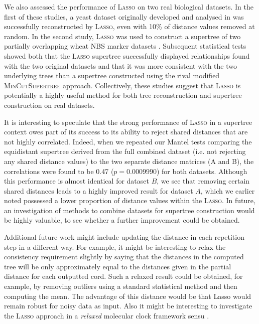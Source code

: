 We also assessed the performance of \textsc{Lasso} on two real biological
datasets. In the first of these studies, a yeast dataset originally developed
and analysed in \cite{west14ribosomal} was successfully reconstructed by
\textsc{Lasso}, even with 10\% of distance values removed at random. In the
second study, \textsc{Lasso} was used to construct a supertree of two
partially overlapping wheat NBS marker datasets \cite{gediflux,
  muge}. Subsequent statistical tests showed both that the \textsc{Lasso}
supertree successfully displayed relationships found with the two original
datasets and that it was more consistent with the two underlying trees than a
supertree constructed using the rival modified \textsc{MinCutSupertree}
approach. Collectively, these studies suggest that \textsc{Lasso} is
potentially a highly useful method for both tree reconstruction and supertree
construction on real datasets.

It is interesting to speculate that the strong performance of \textsc{Lasso}
in a supertree context owes part of its success to its ability to reject
shared distances that are not highly correlated. Indeed, when we repeated our
Mantel tests comparing the equidistant supertree derived from the full
combined dataset (i.e. not rejecting any shared distance values) to the two
separate distance matrices (A and B), the correlations were found to be 0.47
($p = 0.0009990$) for both datasets. Although this performance is almost
identical for dataset $B$, we see that removing certain shared distances leads
to a highly improved result for dataset $A$, which we earlier noted possessed
a lower proportion of distance values within the \textsc{Lasso}.  In future,
an investigation of methods to combine datasets for supertree construction
would be highly valuable, to see whether a further improvement could be
obtained.

Additional future work might include updating the distance in each repetition
step in a different way.  For example, it might be interesting to relax the
consistency requirement slightly by saying that the distances in the computed
tree will be only approximately equal to the distances given in the partial
distance for each outputted cord.  Such a relaxed result could be obtained,
for example, by removing outliers using a standard statistical method and then
computing the mean.  The advantage of this distance would be that {\sc Lasso}
would remain robust for noisy data as input. Also it might be interesting to
investigate the \textsc{Lasso} approach in a {\em relaxed} molecular clock
framework sensu \cite{drummond06relaxed}.

